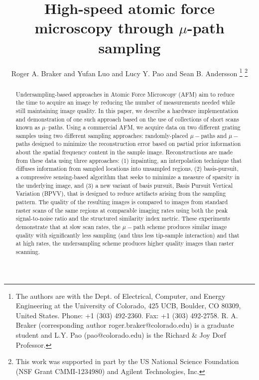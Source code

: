 \documentclass[twocolumn,twoside]{IEEEtran/IEEEtran}
\begin{document}
\title{High-speed atomic force microscopy through $\mu$-path sampling}

\author{Roger A. Braker and Yufan Luo and Lucy Y. Pao and Sean B. Andersson
  \thanks{The authors are with the Dept. of Electrical, Computer, and Energy
    Engineering at the University of Colorado, 425 UCB, Boulder, CO 80309,
    United States. Phone: +1 (303) 492-2360. Fax: +1 (303) 492-2758. R. A.
    Braker (corresponding author roger.braker@colorado.edu) is a graduate
    student and L.Y. Pao (pao@colorado.edu) is the Richard \& Joy Dorf
    Professor.} \thanks{This work was supported in part by the US National
    Science Foundation (NSF Grant CMMI-1234980) and Agilent Technologies, Inc.}
}

\maketitle
\begin{abstract}
  Undersampling-based approaches in Atomic Force Microscopy (AFM) aim to reduce
  the time to acquire an image by reducing the number of measurements needed
  while still maintaining image quality. In this paper, we describe a hardware
  implementation and demonstration of one such approach based on the use of
  collections of short scans known as $\mu$--paths. Using a commercial AFM, we
  acquire data on two different grating samples using two different sampling
  approaches: randomly-placed $\mu-$paths and $\mu-$paths designed to minimize
  the reconstruction error based on partial prior information about the spatial
  frequency content in the sample image. Reconstructions are made from these
  data using three approaches: (1) inpainting, an interpolation technique that
  diffuses information from sampled locations into unsampled regions, (2)
  basis-pursuit, a compressive sensing-based algorithm that seeks to minimize a
  measure of sparsity in the underlying image, and (3) a new variant of basis
  pursuit, Basis Pursuit Vertical Variation (BPVV), that is designed to reduce
  artifacts arising from the sampling pattern. The quality of the resulting
  images is compared to images from standard raster scans of the same regions at
  comparable imaging rates using both the peak signal-to-noise ratio and the
  structured similarity index metric. These experiments demonstrate that at slow
  scan rates, the $\mu-$path scheme produces similar image quality with
  significantly less sampling (and thus less tip-sample interaction) and that at
  high rates, the undersampling scheme produces higher quality images than
  raster scanning.
\end{abstract}
\end{document}

